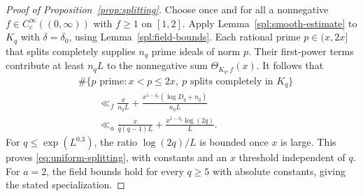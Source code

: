 \begin{proof}[Proof of Proposition~\ref{prop:splitting}]
Choose once and for all a nonnegative
$f\in C_c^\infty((0,\infty))$ with $f\ge1$ on $[1,2]$.
Apply Lemma~\ref{spl:smooth-estimate} to $K_q$ with $\delta=\delta_0$,
using Lemma~\ref{spl:field-bounds}. Each rational prime $p\in(x,2x]$
that splits completely supplies $n_q$ prime ideals of norm $p$.
Their first-power terms contribute at least $n_qL$ to the nonnegative
sum $\Theta_{K_q,f}(x)$. It follows that
\begin{align*}
 &\#\{p\text{ prime}:x<p\le2x,\ p\text{ splits completely in }K_q\}\\
 &\qquad\ll_f \frac{x}{n_qL}
       +\frac{x^{1-\delta_0}(\log D_q+n_q)}{n_qL}\\
 &\qquad\ll_a \frac{x}{q(q-1)L}
       +\frac{x^{1-\delta_0}\log(2q)}{L}.
\end{align*}
For $q\le\exp(L^{0.3})$, the ratio $\log(2q)/L$ is bounded once $x$
is large. This proves \eqref{eq:uniform-splitting}, with constants and
an $x$ threshold independent of $q$. For $a=2$, the field bounds hold
for every $q\ge5$ with absolute constants, giving the stated
specialization.
\end{proof}
